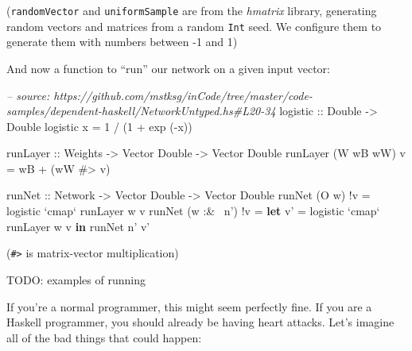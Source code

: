 \documentclass[]{article}
\newenvironment{Shaded}{}{}
\newcommand{\KeywordTok}[1]{\textcolor[rgb]{0.00,0.44,0.13}{\textbf{{#1}}}}
\newcommand{\DataTypeTok}[1]{\textcolor[rgb]{0.56,0.13,0.00}{{#1}}}
\newcommand{\DecValTok}[1]{\textcolor[rgb]{0.25,0.63,0.44}{{#1}}}
\newcommand{\CommentTok}[1]{\textcolor[rgb]{0.38,0.63,0.69}{\textit{{#1}}}}
\newcommand{\OtherTok}[1]{\textcolor[rgb]{0.00,0.44,0.13}{{#1}}}
\newcommand{\FunctionTok}[1]{\textcolor[rgb]{0.02,0.16,0.49}{{#1}}}
\newcommand{\NormalTok}[1]{{#1}}
\begin{document}
(\texttt{randomVector} and \texttt{uniformSample} are from the
\emph{hmatrix} library, generating random vectors and matrices from a
random \texttt{Int} seed. We configure them to generate them with
numbers between -1 and 1)

And now a function to ``run'' our network on a given input vector:

\begin{Shaded}
\begin{Highlighting}[]
\CommentTok{-- source: https://github.com/mstksg/inCode/tree/master/code-samples/dependent-haskell/NetworkUntyped.hs#L20-34}
\OtherTok{logistic ::} \DataTypeTok{Double} \OtherTok{->} \DataTypeTok{Double}
\NormalTok{logistic x }\FunctionTok{=} \DecValTok{1} \FunctionTok{/} \NormalTok{(}\DecValTok{1} \FunctionTok{+} \NormalTok{exp (}\FunctionTok{-}\NormalTok{x))}

\OtherTok{runLayer ::} \DataTypeTok{Weights} \OtherTok{->} \DataTypeTok{Vector} \DataTypeTok{Double} \OtherTok{->} \DataTypeTok{Vector} \DataTypeTok{Double}
\NormalTok{runLayer (}\DataTypeTok{W} \NormalTok{wB wW) v }\FunctionTok{=} \NormalTok{wB }\FunctionTok{+} \NormalTok{(wW }\FunctionTok{#>} \NormalTok{v)}

\OtherTok{runNet ::} \DataTypeTok{Network} \OtherTok{->} \DataTypeTok{Vector} \DataTypeTok{Double} \OtherTok{->} \DataTypeTok{Vector} \DataTypeTok{Double}
\NormalTok{runNet (}\DataTypeTok{O} \NormalTok{w)      }\FunctionTok{!}\NormalTok{v }\FunctionTok{=} \NormalTok{logistic }\OtherTok{`cmap`} \NormalTok{runLayer w v}
\NormalTok{runNet (w }\FunctionTok{:&~} \NormalTok{n') }\FunctionTok{!}\NormalTok{v }\FunctionTok{=} \KeywordTok{let} \NormalTok{v' }\FunctionTok{=} \NormalTok{logistic }\OtherTok{`cmap`} \NormalTok{runLayer w v}
                       \KeywordTok{in}  \NormalTok{runNet n' v'}
\end{Highlighting}
\end{Shaded}

(\texttt{\#\textgreater{}} is matrix-vector multiplication)

TODO: examples of running

If you're a normal programmer, this might seem perfectly fine. If you
are a Haskell programmer, you should already be having heart attacks.
Let's imagine all of the bad things that could happen:
\end{document}
